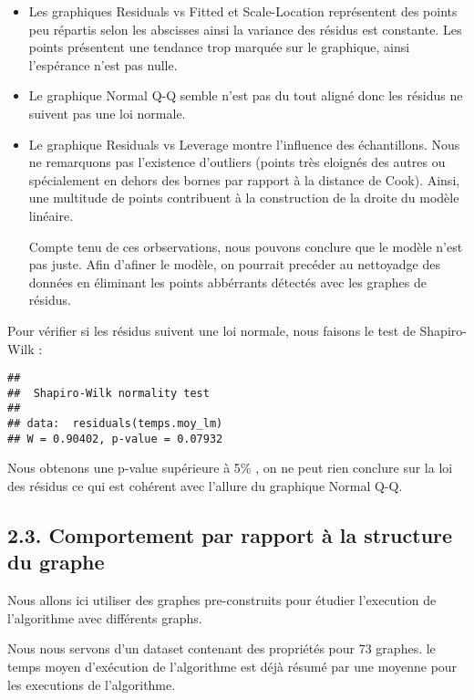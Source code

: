 \documentclass[
]{article}
\begin{document}
\begin{itemize}
\item
  Les graphiques Residuals vs Fitted et Scale-Location représentent des
  points peu répartis selon les abscisses ainsi la variance des résidus
  est constante. Les points présentent une tendance trop marquée sur le
  graphique, ainsi l'espérance n'est pas nulle.
\item
  Le graphique Normal Q-Q semble n'est pas du tout aligné donc les
  résidus ne suivent pas une loi normale.
\item
  Le graphique Residuals vs Leverage montre l'influence des
  échantillons. Nous ne remarquons pas l'existence d'outliers (points
  très eloignés des autres ou spécialement en dehors des bornes par
  rapport à la distance de Cook). Ainsi, une multitude de points
  contribuent à la construction de la droite du modèle linéaire.

  Compte tenu de ces orbservations, nous pouvons conclure que le modèle
  n'est pas juste. Afin d'afiner le modèle, on pourrait precéder au
  nettoyadge des données en éliminant les points abbérrants détectés
  avec les graphes de résidus.
\end{itemize}

Pour vérifier si les résidus suivent une loi normale, nous faisons le
test de Shapiro-Wilk :

\begin{verbatim}
## 
##  Shapiro-Wilk normality test
## 
## data:  residuals(temps.moy_lm)
## W = 0.90402, p-value = 0.07932
\end{verbatim}

Nous obtenons une p-value supérieure à 5\% , on ne peut rien conclure
sur la loi des résidus ce qui est cohérent avec l'allure du graphique
Normal Q-Q.

\hypertarget{comportement-par-rapport-uxe0-la-structure-du-graphe}{%
\subsection{2.3. Comportement par rapport à la structure du
graphe}\label{comportement-par-rapport-uxe0-la-structure-du-graphe}}

Nous allons ici utiliser des graphes pre-construits pour étudier
l'execution de l'algorithme avec différents graphs.

Nous nous servons d'un dataset contenant des propriétés pour 73 graphes.
le temps moyen d'exécution de l'algorithme est déjà résumé par une
moyenne pour les executions de l'algorithme.
\end{document}
